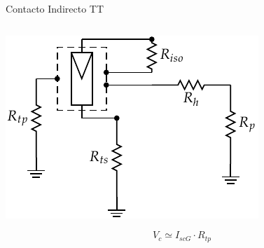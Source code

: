 \documentclass[xcolor={usenames,svgnames,dvipsnames}]{beamer}
\begin{document}
\begin{frame}[label={sec:org8bac7b4}]{Contacto Indirecto TT}
\begin{columns}
\begin{column}{0.5\columnwidth}
\begin{center}
\includegraphics[width=\textwidth]{../figs/ContactoIndirectoTT.pdf}
\end{center}
$$V_{c}\simeq I_{scG}\cdot R_{tp}$$
\end{column}


\end{columns}
\end{frame}
\end{document}
